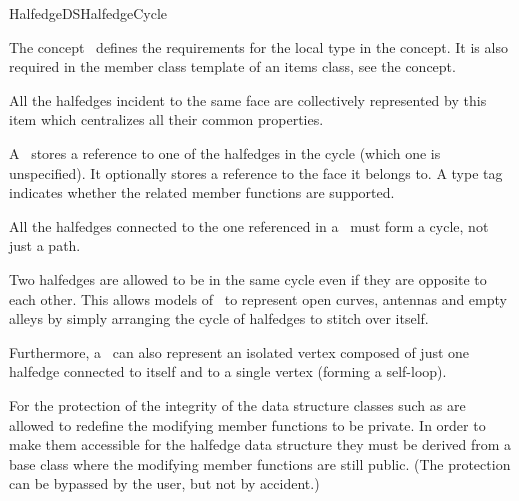 
\ccRefPageBegin



\begin{ccRefConcept}{HalfedgeDSHalfedgeCycle}
\label{pageHalfedgeDSItemsHalfedgeCycleRef}


\ccDefinition
  
The concept \ccRefName\ defines the requirements for the local  
type in the  concept. It is also required in 
the  member class template of an
items class, see the  concept.

All the halfedges incident to the same face are collectively represented
by this \ccRefName\  item which centralizes all their common properties.

A \ccRefName\ stores a reference to one of the halfedges in the cycle (which one is unspecified).
It optionally stores a reference to the face it belongs to. A type tag indicates whether 
the related member functions are supported. 

All the halfedges connected to the one referenced in a \ccRefName\ must form a cycle, not just a path.

Two halfedges are allowed to be in the same cycle even if they are opposite to each other. 
This allows models of \ccRefName\ to represent open curves, antennas and empty alleys by simply arranging 
the cycle of halfedges to stitch over itself. 

Furthermore, a \ccRefName\ can also represent an isolated vertex composed of just one halfedge
connected to itself and to a single vertex (forming a self-loop).

For the protection of the integrity of the data structure classes such as
 are allowed to redefine the modifying member 
functions to be private. In order to make them accessible for the 
halfedge data structure they must be derived from a base class 
where the modifying member functions are still public. (The protection
can be bypassed by the user, but not by accident.)


\end{ccRefConcept}
